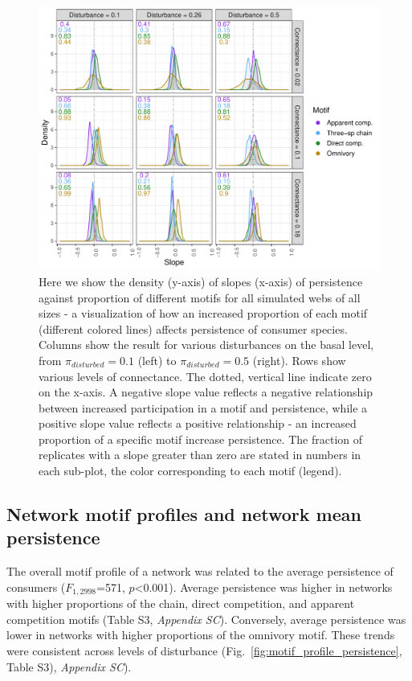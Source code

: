 \documentclass[12pt]{article}
\begin{document}
\begin{spacing}{2.0}
        \begin{figure}[h!]
            \centering
            \includegraphics[width=\textwidth]{figures/prop_dens_bp_vs_C_allS.pdf}
            \caption{Here we show the density (y-axis) of slopes (x-axis) of persistence against proportion of different motifs for all simulated webs of all sizes - a visualization of how an increased proportion of each motif (different colored lines) affects persistence of consumer species. Columns show the result for various disturbances on the basal level, from $\pi_{disturbed} = 0.1$ (left) to $\pi_{disturbed} = 0.5$ (right). Rows show various levels of connectance. The dotted, vertical line indicate zero on the x-axis. A negative slope value reflects a negative relationship between increased participation in a motif and persistence, while a positive slope value reflects a positive relationship - an increased proportion of a specific motif increase persistence. The fraction of replicates with a slope greater than zero are stated in numbers in each sub-plot, the color corresponding to each motif (legend). }
            \label{fig:density_prop_C}
        \end{figure}    
    

    \subsection*{Network motif profiles and network mean persistence}
    
        The overall motif profile of a network was related to the average persistence of consumers ($F_{1,2998}$=571, $p$\textless0.001). 
        Average persistence was higher in networks with higher proportions of the chain, direct competition, and apparent competition motifs (Table S3, \emph{Appendix SC}). 
        Conversely, average persistence was lower in networks with higher proportions of the omnivory motif. 
        These trends were consistent across levels of disturbance (Fig.~\ref{fig:motif_profile_persistence}, Table S3), \emph{Appendix SC}).%


\end{spacing}
\end{document}
